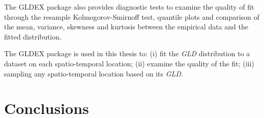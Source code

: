 The GLDEX package also provides diagnostic tests to examine the quality of fit through the resample Kolmogorov-Smirnoff test, quantile plots and comparison of the mean, variance, skewness and kurtosis between the empirical data and the fitted distribution.

The GLDEX package is used in this thesis to: (i) fit the \textit{GLD} distribution to a dataset on each spatio-temporal location; (ii) examine the quality of the fit; (iii) sampling any spatio-temporal location based on its \textit{GLD}.

\section{Conclusions}

